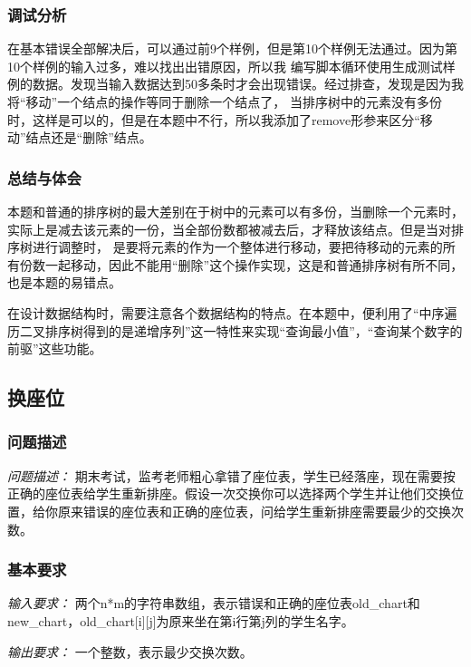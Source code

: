 \documentclass[a4paper,11pt]{article}%
\newenvironment{shadedquotation}
 {\begin{shaded*}
  \quoting[leftmargin=0pt, vskip=0pt]
 }
 {\endquoting
 \end{shaded*}
}
\begin{document}
\subsubsection{调试分析}
在基本错误全部解决后，可以通过前9个样例，但是第10个样例无法通过。因为第10个样例的输入过多，难以找出出错原因，所以我
编写脚本循环使用生成测试样例的数据。发现当输入数据达到50多条时才会出现错误。经过排查，发现是因为我将“移动”一个结点的操作等同于删除一个结点了，
当排序树中的元素没有多份时，这样是可以的，但是在本题中不行，所以我添加了remove形参来区分“移动”结点还是“删除”结点。
\subsubsection{总结与体会}
本题和普通的排序树的最大差别在于树中的元素可以有多份，当删除一个元素时，实际上是减去该元素的一份，当全部份数都被减去后，才释放该结点。但是当对排序树进行调整时，
是要将元素的作为一个整体进行移动，要把待移动的元素的所有份数一起移动，因此不能用“删除”这个操作实现，这是和普通排序树有所不同，也是本题的易错点。

在设计数据结构时，需要注意各个数据结构的特点。在本题中，便利用了“中序遍历二叉排序树得到的是递增序列”这一特性来实现“查询最小值”，“查询某个数字的前驱”这些功能。
\subsection{换座位}
\subsubsection{问题描述}
\begin{shadedquotation}
    \emph{问题描述：}
    期末考试，监考老师粗心拿错了座位表，学生已经落座，现在需要按正确的座位表给学生重新排座。假设一次交换你可以选择两个学生并让他们交换位置，给你原来错误的座位表和正确的座位表，问给学生重新排座需要最少的交换次数。
\end{shadedquotation}
\subsubsection{基本要求}
\begin{shadedquotation}
    \emph{输入要求：}
    两个n*m的字符串数组，表示错误和正确的座位表old\_chart和new\_chart，old\_chart[i][j]为原来坐在第i行第j列的学生名字。
\end{shadedquotation}
\begin{shadedquotation}
    \emph{输出要求：}
    一个整数，表示最少交换次数。
\end{shadedquotation}
\end{document}
